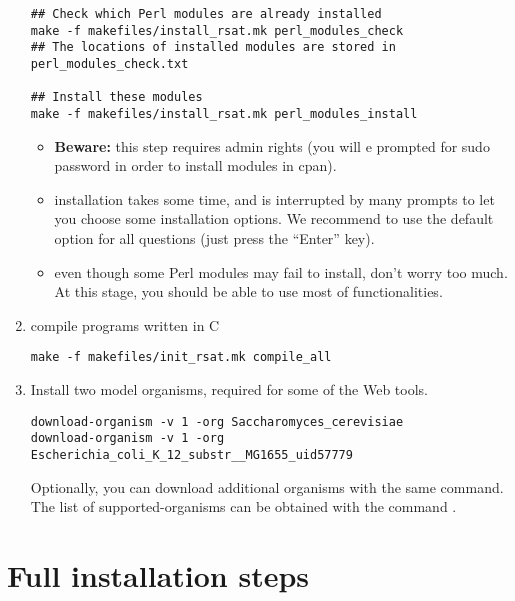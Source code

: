 \documentclass[12pt,a4paper, oneside]{scrreprt} %
\begin{document}
\begin{enumerate}
\begin{lstlisting}
## Check which Perl modules are already installed
make -f makefiles/install_rsat.mk perl_modules_check
## The locations of installed modules are stored in perl_modules_check.txt

## Install these modules
make -f makefiles/install_rsat.mk perl_modules_install
  \end{lstlisting}


  \begin{itemize}
  \item \textbf{Beware: } this step requires admin rights (you will e
    prompted for sudo password in order to install modules in cpan).
    
  \item {} installation takes some time, and is interrupted
    by many prompts to let you choose some installation options. We
    recommend to use the default option for all questions (just press
    the ``Enter'' key).
    
  \item even though some Perl modules may fail to install, don't worry
    too much. At this stage, you should be able to use most of \RSAT
    functionalities.
  \end{itemize}

\item compile \RSAT programs written in C

  \begin{lstlisting}
make -f makefiles/init_rsat.mk compile_all
  \end{lstlisting}


\item Install two model organisms, required for some of the Web tools.

  \begin{lstlisting}
download-organism -v 1 -org Saccharomyces_cerevisiae
download-organism -v 1 -org Escherichia_coli_K_12_substr__MG1655_uid57779
  \end{lstlisting}
  
  Optionally, you can download additional organisms with the same
  command. The list of supported-organisms can be obtained with the
  command .

\end{enumerate}


\section{Full installation steps}
\end{document}
